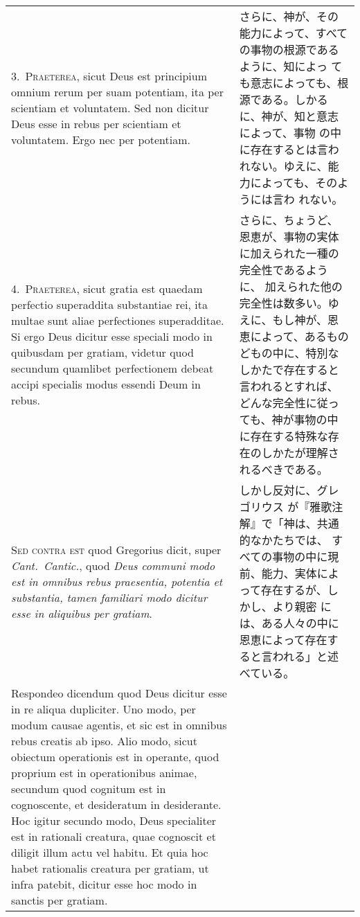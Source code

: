 \documentclass[10pt]{jsarticle} %
\begin{document}
\begin{longtable}{p{21em}p{21em}}
3.~{\scshape Praeterea}, sicut Deus est principium omnium rerum per suam
 potentiam, ita per scientiam et voluntatem. Sed non dicitur Deus esse
 in rebus per scientiam et voluntatem. Ergo nec per potentiam.

&

さらに、神が、その能力によって、すべての事物の根源であるように、知によっ
 ても意志によっても、根源である。しかるに、神が、知と意志によって、事物
 の中に存在するとは言われない。ゆえに、能力によっても、そのようには言わ
 れない。

\\

4.~{\scshape Praeterea}, sicut gratia est quaedam perfectio superaddita
 substantiae rei, ita multae sunt aliae perfectiones superadditae. Si
 ergo Deus dicitur esse speciali modo in quibusdam per gratiam, videtur
 quod secundum quamlibet perfectionem debeat accipi specialis modus
 essendi Deum in rebus.

&

さらに、ちょうど、恩恵が、事物の実体に加えられた一種の完全性であるように、
 加えられた他の完全性は数多い。ゆえに、もし神が、恩恵によって、あるもの
 どもの中に、特別なしかたで存在すると言われるとすれば、どんな完全性に従っ
 ても、神が事物の中に存在する特殊な存在のしかたが理解されるべきである。

\\

{\scshape Sed contra est} quod Gregorius dicit, super {\itshape
 Cant.~Cantic.}, quod {\itshape Deus communi modo est in omnibus rebus
 praesentia, potentia et substantia, tamen familiari modo dicitur esse
 in aliquibus per gratiam}.

&

しかし反対に、グレゴリウス が『雅歌注解』で「神は、共通的なかたちでは、
 すべての事物の中に現前、能力、実体によって存在するが、しかし、より親密
 には、ある人々の中に恩恵によって存在すると言われる」と述べている。

\\

Respondeo dicendum quod Deus dicitur esse in re aliqua dupliciter. Uno
 modo, per modum causae agentis, et sic est in omnibus rebus creatis ab
 ipso. Alio modo, sicut obiectum operationis est in operante, quod
 proprium est in operationibus animae, secundum quod cognitum est in
 cognoscente, et desideratum in desiderante. Hoc igitur secundo modo,
 Deus specialiter est in rationali creatura, quae cognoscit et diligit
 illum actu vel habitu. Et quia hoc habet rationalis creatura per
 gratiam, ut infra patebit, dicitur esse hoc modo in sanctis per
 gratiam. 


\end{longtable}
\end{document}
